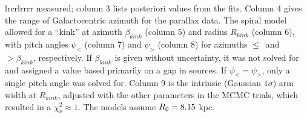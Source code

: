\documentclass[12pt,preprint]{aastex}
\def\Ro    {\ifmmode{R_0}\else{$R_0$}\fi}
\begin{document}
\begin{deluxetable}{lrcrlrrrr}
{measured; column 3 lists posteriori values from the fits.  Column 4 gives the range of Galactocentric
azimuth for the parallax data.   The spiral model allowed for a ``kink'' at azimuth $\beta_{kink}$ 
(column 5) and radius $R_{kink}$ (column 6), with pitch angles $\psi_<$ (column 7) and $\psi_>$
(column 8) for azimuths $\le$~and~$>\beta_{kink}$, respectively.   If $\beta_{kink}$ is given without
uncertainty, it was not solved for and assigned a value based primarily on a gap in sources.
If $\psi_< = \psi_>$, only a single pitch angle was solved for.
Column 9 is the intrinsic (Gaussian $1\sigma$) arm width at $R_{kink}$, 
adjusted with the other parameters in the MCMC trials, which resulted in a $\chi_\nu^2\approx1$.  
The models assume $\Ro=8.15$ kpc.
               }
\label{table:pitchangles}
\end{deluxetable}
\end{document}
